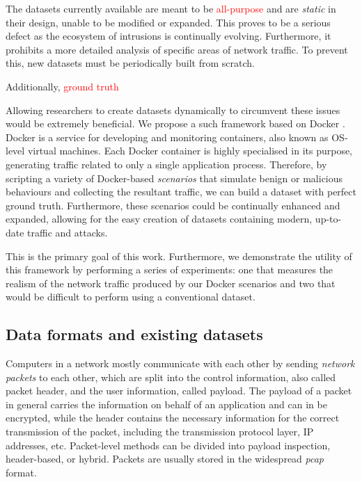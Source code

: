 \documentclass[sigconf,anonymous]{acmart}\usepackage[]{graphicx}\usepackage[]{color}
\begin{document}
The datasets currently available are meant to be \textcolor{red}{all-purpose} and are \textit{static} in their design, unable to be modified or expanded. This proves to be a serious defect as the ecosystem of intrusions is continually evolving. Furthermore, it prohibits a more detailed analysis of specific areas of network traffic. To prevent this, new datasets must be periodically built from scratch.

Additionally, \textcolor{red}{ground truth}

Allowing researchers to create datasets dynamically to circumvent these issues would be extremely beneficial. We propose a such framework based on Docker \cite{docker}. Docker is a service for developing and monitoring containers, also known as OS-level virtual machines. Each Docker container is highly specialised in its purpose, generating traffic related to only a single application process. Therefore, by scripting a variety of Docker-based \textit{scenarios} that simulate benign or malicious behaviours and collecting the resultant traffic, we can build a dataset with perfect ground truth. Furthermore, these scenarios could be continually enhanced and expanded, allowing for the easy creation of datasets containing modern, up-to-date traffic and attacks. 



This is the primary goal of this work. Furthermore, we demonstrate the utility of this framework by performing a series of experiments: one that measures the realism of the network traffic produced by our Docker scenarios and two that would be difficult to perform using a conventional dataset.

\subsection{Data formats and existing datasets}

Computers in a network mostly communicate with each other by sending \textit{network packets} to each other, which are split into the control information, also called packet header, and the user information, called payload. The payload of a packet in general carries the information on behalf of an application and can in be encrypted, while the header contains the necessary information for the correct transmission of the packet, including the transmission protocol layer, IP addresses, etc. Packet-level methods can be divided into payload inspection, header-based, or hybrid. Packets are usually stored in the widespread \textit{pcap} format.
\end{document}
